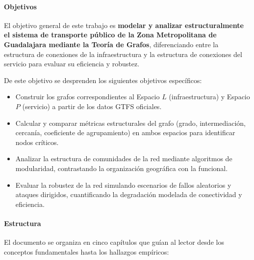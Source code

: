 \paragraph{Objetivos}

El objetivo general de este trabajo es \textbf{modelar y analizar estructuralmente el sistema de transporte público de la Zona Metropolitana de Guadalajara mediante la Teoría de Grafos}, diferenciando entre la estructura de conexiones de la infraestructura y la estructura de conexiones del servicio para evaluar su eficiencia y robustez.

De este objetivo se desprenden los siguientes objetivos específicos:
\begin{itemize}
    \item Construir los grafos correspondientes al Espacio $L$ (infraestructura) y Espacio $P$ (servicio) a partir de los datos GTFS oficiales.
    \item Calcular y comparar métricas estructurales del grafo (grado, intermediación, cercanía, coeficiente de agrupamiento) en ambos espacios para identificar nodos críticos.
    \item Analizar la estructura de comunidades de la red mediante algoritmos de modularidad, contrastando la organización geográfica con la funcional.
    \item Evaluar la robustez de la red simulando escenarios de fallos aleatorios y ataques dirigidos, cuantificando la degradación modelada de conectividad y eficiencia.
\end{itemize}

\paragraph{Estructura}

El documento se organiza en cinco capítulos que guían al lector desde los conceptos fundamentales hasta los hallazgos empíricos:

